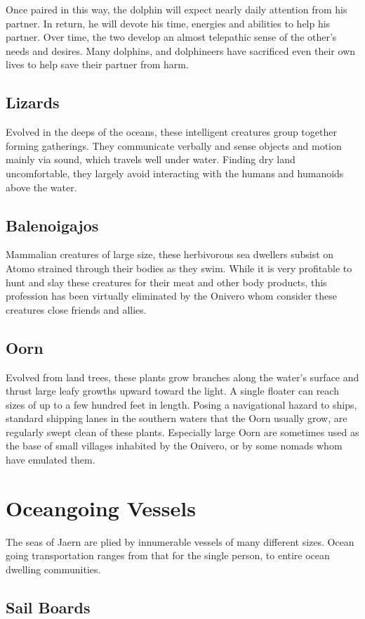 Once paired in this way, the dolphin will expect nearly daily attention from his partner. In return, he will devote his time, energies and abilities to help his partner. Over time, the two develop an almost telepathic sense of the other's needs and desires. Many dolphins, and dolphineers have sacrificed even their own lives to help save their partner from harm.
\subsection{Lizards}
Evolved in the deeps of the oceans, these intelligent creatures group together forming gatherings. They communicate verbally and sense objects and motion mainly via sound, which travels well under water. Finding dry land uncomfortable, they largely avoid interacting with the humans and humanoids above the water.
\subsection{Balenoigajos}
Mammalian creatures of large size, these  herbivorous sea dwellers subsist on Atomo strained through their bodies as they swim. While it is very profitable to hunt
and slay these creatures for their meat and other body products, this profession has been virtually eliminated by the Onivero whom consider these creatures close friends and allies.
\subsection{Oorn}
Evolved from land trees, these plants grow branches along the water's surface and thrust large leafy growths upward toward the light. A single floater can reach sizes of up to a few hundred feet in length. Posing a  navigational hazard to ships, standard shipping lanes in the southern waters that the Oorn usually grow, are regularly swept clean of these plants. Especially large Oorn are sometimes used as the base of small villages inhabited by the Onivero, or by some nomads whom have emulated them.
\section{Oceangoing Vessels}
The seas of Jaern are plied by innumerable vessels of many different sizes. Ocean going transportation ranges from that for the single person, to entire ocean dwelling communities.
\subsection{Sail Boards}

